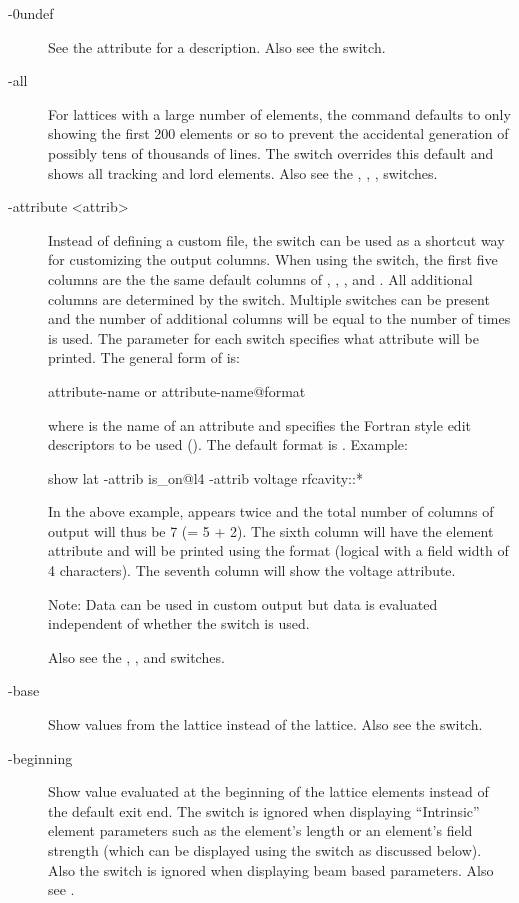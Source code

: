 {{{{{{{{\begin{description}
\item[-0undef] \Newline
See the  attribute for a description. Also see the  switch.
%
\item[-all] \Newline
For lattices with a large number of elements, the  command defaults to only showing
the first 200 elements or so to prevent the accidental generation of possibly tens of thousands of
lines. The  switch overrides this default and shows all tracking and lord elements. Also
see the , , ,  switches.
%
\item[-attribute <attrib>] \Newline
Instead of defining a custom file, the  switch can be used as a shortcut way
for customizing the output columns.  When using the  switch, the first five columns
are the the same default columns of , , ,  and
. All additional columns are determined by the  switch. Multiple
 switches can be present and the number of additional columns will be equal to the
number of times  is used.  The  parameter for each 
switch specifies what attribute will be printed.  The general form of  is:
\begin{example}
  attribute-name         or
  attribute-name@format
\end{example}
where  is the name of an attribute and  specifies the Fortran style
edit descriptors to be used (). The default format is .  Example:
\begin{example}
  show lat -attrib is_on@l4 -attrib voltage rfcavity::*
\end{example}
In the above example,  appears twice and the total number of columns of output will
thus be 7 (= 5 + 2). The sixth column will have the  element attribute and will be printed
using the  format (logical with a field width of 4 characters). The seventh column will show
the voltage attribute.

Note: Data can be used in custom output but data is evaluated independent of whether the
 switch is used.

Also see the , , and  switches.
%
\item[-base] \Newline
  Show values from the  lattice instead of the  lattice. Also see the  switch.
%
\item[-beginning] \Newline
Show value evaluated at the beginning of the lattice elements instead of the default exit end.  The
 switch is ignored when displaying ``Intrinsic'' element parameters such as the
element's length or an element's field strength (which can be displayed using the 
switch as discussed below). Also the  switch is ignored when displaying beam based
parameters. Also see .


\end{description}}}}}}}}}
